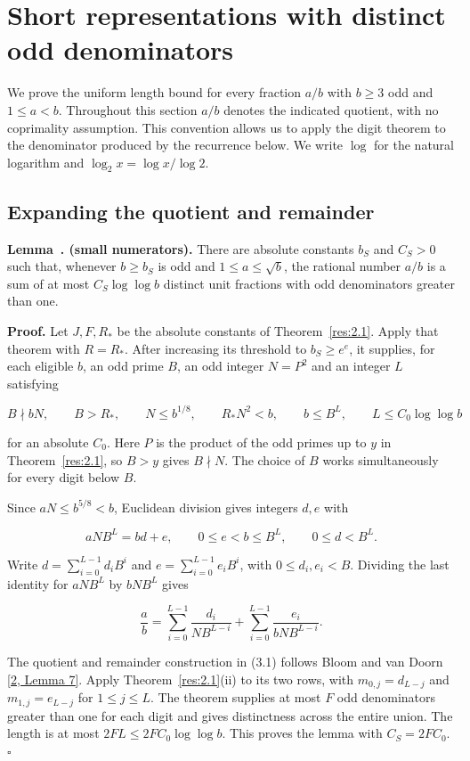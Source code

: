 \documentclass[11pt,a4paper]{article}
\newcounter{result}[section]
\renewcommand{\theresult}{\thesection.\arabic{result}}
\newcommand{\paperstatement}[3]{%
  \refstepcounter{result}\label{res:#2}%
  \noindent\textbf{#1~\theresult#3.}\enspace\ignorespaces}
\begin{document}
\section{Short representations with distinct odd denominators}

We prove the uniform length bound for every fraction $a/b$ with $b\ge 3$ odd and $1\le a<b$. Throughout this section $a/b$ denotes the indicated quotient, with no coprimality assumption. This convention allows us to apply the digit theorem to the denominator produced by the recurrence below. We write $\log$ for the natural logarithm and $\log_2 x=\log x/\log 2$.

\subsection{Expanding the quotient and remainder}

\paperstatement{Lemma}{3.1}{ (small numerators)} There are absolute constants $b_S$ and $C_S>0$ such that, whenever $b\ge b_S$ is odd and $1\le a\le\sqrt b$, the rational number $a/b$ is a sum of at most $C_S\log\log b$ distinct unit fractions with odd denominators greater than one.

\textbf{Proof.} Let $J,F,R_*$ be the absolute constants of Theorem~\ref{res:2.1}. Apply that theorem with $R=R_*$. After increasing its threshold to $b_S\ge e^e$, it supplies, for each eligible $b$, an odd prime $B$, an odd integer $N=P^2$ and an integer $L$ satisfying

\[
B\nmid bN,\qquad B>R_*,\qquad N\le b^{1/8},\qquad R_*N^2<b,
 \qquad b\le B^L,\qquad L\le C_0\log\log b
\]

for an absolute $C_0$. Here $P$ is the product of the odd primes up to $y$ in Theorem~\ref{res:2.1}, so $B>y$ gives $B\nmid N$. The choice of $B$ works simultaneously for every digit below $B$.

Since $aN\le b^{5/8}<b$, Euclidean division gives integers $d,e$ with

\[
aNB^L=bd+e,\qquad 0\le e<b\le B^L,\qquad 0\le d<B^L.
\]

Write $d=\sum_{i=0}^{L-1}d_iB^i$ and $e=\sum_{i=0}^{L-1}e_iB^i$, with $0\le d_i,e_i<B$. Dividing the last identity for $aNB^L$ by $bNB^L$ gives

\[
\frac ab=\sum_{i=0}^{L-1}\frac{d_i}{NB^{L-i}}
       +\sum_{i=0}^{L-1}\frac{e_i}{bNB^{L-i}}. \tag{3.1}
\]

The quotient and remainder construction in (3.1) follows Bloom and van Doorn \hyperlink{ref-2}{[2, Lemma 7]}. Apply Theorem~\ref{res:2.1}(ii) to its two rows, with $m_{0,j}=d_{L-j}$ and $m_{1,j}=e_{L-j}$ for $1\le j\le L$. The theorem supplies at most $F$ odd denominators greater than one for each digit and gives distinctness across the entire union. The length is at most $2FL\le 2FC_0\log\log b$. This proves the lemma with $C_S=2FC_0$. $\square$
\end{document}
